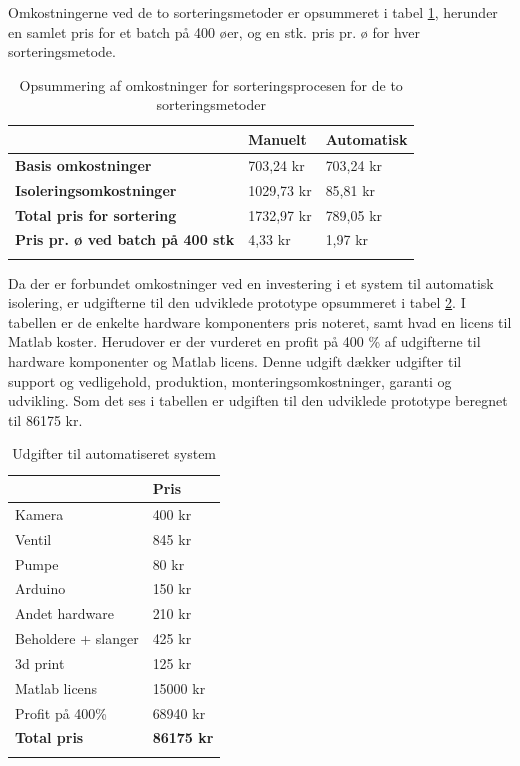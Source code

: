 Omkostningerne ved de to sorteringsmetoder er opsummeret i tabel \ref{tab:totalcost}, herunder en samlet pris for et batch på 400 øer, og en stk. pris pr. ø for hver sorteringsmetode.
\begin{center}
		\begin{longtable}{ | m{8cm} | m{2.25cm} | m{2.25cm} | } 
			\hline
			 &\textbf{Manuelt} & \textbf{Automatisk} \\ 
			\hline
			 \textbf{Basis omkostninger} & 703,24 kr & 703,24 kr \\ 
			\hline
			 \textbf{Isoleringsomkostninger} & 1029,73 kr & 85,81 kr \\ 
			\hline
			\textbf{Total pris for sortering} & 1732,97 kr & 789,05 kr \\ 
			\hline
			\textbf{Pris pr. ø ved batch på 400 stk} & 4,33 kr & 1,97 kr \\ 
			\hline
			\caption{Opsummering af omkostninger for sorteringsprocesen for de to sorteringsmetoder}
			\label{tab:totalcost}
			 		\end{longtable}
\end{center}

Da der er forbundet omkostninger ved en investering i et system til automatisk isolering, er udgifterne til den udviklede prototype opsummeret i tabel \ref{tab:prototypecost}. I tabellen er de enkelte hardware komponenters pris noteret, samt hvad en licens til Matlab koster. Herudover er der vurderet en profit på 400 \% af udgifterne til hardware komponenter og Matlab licens. Denne udgift dækker udgifter til support og vedligehold, produktion, monteringsomkostninger, garanti og udvikling. Som det ses i tabellen er udgiften til den udviklede prototype beregnet til 86175 kr.
\begin{center}
		\begin{longtable}{ | m{9.5cm} | m{3.5cm} | } 
			\hline
			  & \textbf{Pris} \\ 
			\hline
			Kamera & 400 kr \\ 
			\hline
			 Ventil & 845 kr\\ 
			\hline
			Pumpe & 80 kr  \\ 
			\hline
			Arduino & 150 kr \\ 
			\hline
			Andet hardware & 210 kr \\ 
			\hline
			Beholdere + slanger & 425 kr \\ 
			\hline
			3d print & 125 kr \\ 
			\hline
			Matlab licens & 15000 kr \\
			\hline
			Profit på 400\% & 68940 kr \\	
			\hline
			\textbf{Total pris} & \textbf{86175 kr} \\		
			
			\hline
			\caption{Udgifter til automatiseret system}
			\label{tab:prototypecost}
			 		\end{longtable}
\end{center}


